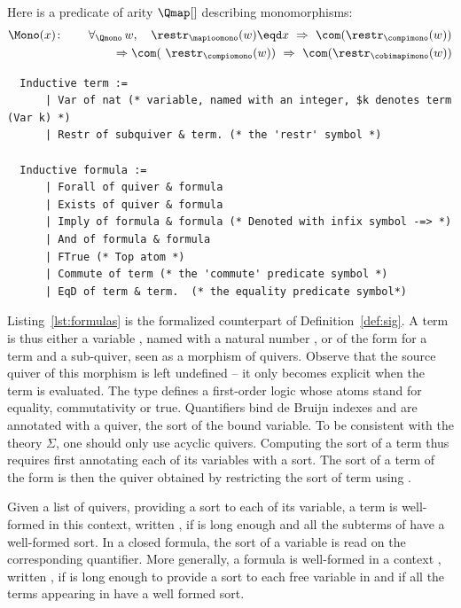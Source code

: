 \documentclass[a4paper,UKenglish,cleveref, autoref, thm-restate]{lipics-v2021}
\begin{document}
\begin{example}\label{ex:mono}
  Here is a predicate of arity $\Qmap[]$ describing monomorphisms:
  \begin{align*}
    \Mono(x)\colon\qquad& \forall_{\Qmono}\, w,\quad \restr_{\mapioomono}(w) \eqd x \ \Rightarrow \ \com(\restr_{\compimono}(w))  \\
    &\qquad \Rightarrow \com(\ \restr_{\compiomono}(w)) \ \Rightarrow \ \com(\restr_{\cobimapimono}(w))
  \end{align*}
\end{example}

\begin{listing}[!t]
\begin{verbatim}
  Inductive term :=
      | Var of nat (* variable, named with an integer, $k denotes term (Var k) *)
      | Restr of subquiver & term. (* the 'restr' symbol *)

  Inductive formula :=
      | Forall of quiver & formula
      | Exists of quiver & formula
      | Imply of formula & formula (* Denoted with infix symbol -=> *)
      | And of formula & formula
      | FTrue (* Top atom *)
      | Commute of term (* the 'commute' predicate symbol *)
      | EqD of term & term.  (* the equality predicate symbol*)
\end{verbatim}
\caption{Terms and formulas}
\label{lst:formulas}
\end{listing}

Listing~\ref{lst:formulas} is the formalized counterpart of Definition~\ref{def:sig}. A term  is thus either a variable , named with a natural number , or of the form  for  a term and  a sub-quiver, seen as a morphism of quivers. Observe that the source quiver of this morphism is left undefined -- it only becomes explicit when the term is evaluated. The type  defines a first-order logic whose atoms stand for equality, commutativity or true. Quantifiers bind de Bruijn indexes and are annotated with a quiver, the sort of the bound variable. To be consistent with the theory $\Sigma$, one should only use acyclic quivers. Computing the sort of a term thus requires first annotating each of its variables with a sort. The sort of  a term of the form  is then the quiver obtained by restricting the sort of term  using .

Given a list  of quivers, providing a sort to each of its variable, a term  is well-formed in this context, written , if  is long enough and all the subterms of  have a well-formed sort. In a closed formula, the sort of a variable is read on the corresponding quantifier. More generally, a formula  is well-formed in a context , written , if  is long enough to provide a sort to each free variable in  and if all the terms appearing in  have a well formed sort.
\end{document}

